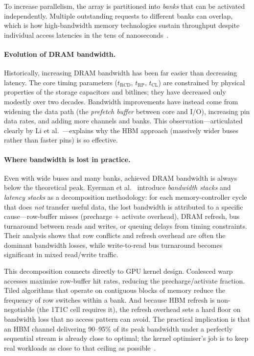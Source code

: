 To increase parallelism, the array is partitioned into \emph{banks} that can
be activated independently. Multiple outstanding requests to different banks
can overlap, which is how high-bandwidth memory technologies sustain
throughput despite individual access latencies in the tens of
nanoseconds~\cite{li2018highspeed-dram}.

\paragraph{Evolution of DRAM bandwidth.}
Historically, increasing DRAM bandwidth has been far easier than decreasing
latency. The core timing parameters ($t_\text{RCD}$, $t_\text{RP}$,
$t_\text{CL}$) are constrained by physical properties of the storage
capacitors and bitlines; they have decreased only modestly over two decades.
Bandwidth improvements have instead come from widening the data path (the
\emph{prefetch buffer} between core and I/O), increasing pin data rates, and
adding more channels and banks. This observation---articulated clearly
by Li et al.~\cite{li2018highspeed-dram}---explains why the HBM approach (massively
wider buses rather than faster pins) is so effective.

\paragraph{Where bandwidth is lost in practice.}
Even with wide buses and many banks, achieved DRAM bandwidth is always
below the theoretical peak. Eyerman et al.~\cite{eyerman2022dram-stacks}
introduce \emph{bandwidth stacks} and \emph{latency stacks} as a
decomposition methodology: for each memory-controller cycle that does
\emph{not} transfer useful data, the lost bandwidth is attributed to a
specific cause---row-buffer misses (precharge + activate overhead), DRAM
refresh, bus turnaround between reads and writes, or queuing delays from
timing constraints. Their analysis shows that row conflicts and refresh
overhead are often the dominant bandwidth losses, while write-to-read bus
turnaround becomes significant in mixed read/write traffic.

This decomposition connects directly to GPU kernel design. Coalesced
warp accesses maximise row-buffer hit rates, reducing the
precharge/activate fraction. Tiled algorithms that operate on contiguous
blocks of memory reduce the frequency of row switches within a bank.
And because HBM refresh is non-negotiable (the 1T1C cell requires it),
the refresh overhead sets a hard floor on bandwidth loss that no access
pattern can avoid. The practical implication is that an HBM channel
delivering 90--95\% of its peak bandwidth under a perfectly sequential
stream is already close to optimal; the kernel optimiser's job is to
keep real workloads as close to that ceiling as
possible~\cite{eyerman2022dram-stacks,li2018highspeed-dram}.

